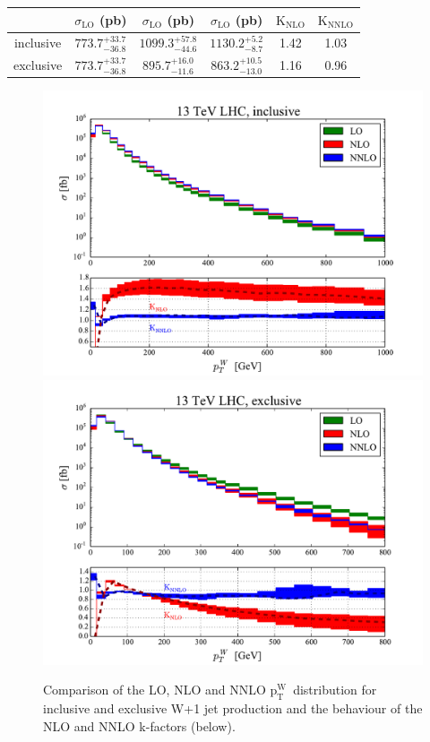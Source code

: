 \documentclass[a4paper,11pt,notoc]{article}
\newcommand{\ptW}{\ensuremath{\mathrm{p_T^{W}}}}
\begin{document}
\begin{table}[h!]
\centering
\begin{tabular}{|c|ccccc|} \hline
  & $\sigma_{\mathrm {LO}}$ (pb) & $\sigma_{\mathrm {LO}}$ (pb) & $\sigma_{\mathrm {LO}}$ (pb) & $\mathrm {K_{NLO}}$ & $\mathrm {K_{NNLO}}$ \\ \hline 
inclusive & $773.7^{+33.7}_{-36.8}$ & $1099.3^{+57.8}_{-44.6}$ & $1130.2^{+5.2}_{-8.7}$ & 1.42 & 1.03 \\
exclusive & $773.7^{+33.7}_{-36.8}$ & $895.7^{+16.0}_{-11.6}$ & $863.2^{+10.5}_{-13.0}$ & 1.16 & 0.96 \\
\hline
\end{tabular}
\label{tab:Wjet}
\end{table}

\begin{figure}[t!]
\centering
\includegraphics[width=0.495\columnwidth]{pTW_13TeV_incl.pdf} 
\includegraphics[width=0.495\columnwidth]{pTW_13TeV_excl.pdf} 
\caption{Comparison of the LO, NLO and NNLO \ptW\ distribution for inclusive and exclusive W+1 jet production and the behaviour of the NLO and NNLO k-factors (below).}
\label{fig:Wpt}
\end{figure}   
\end{document}
